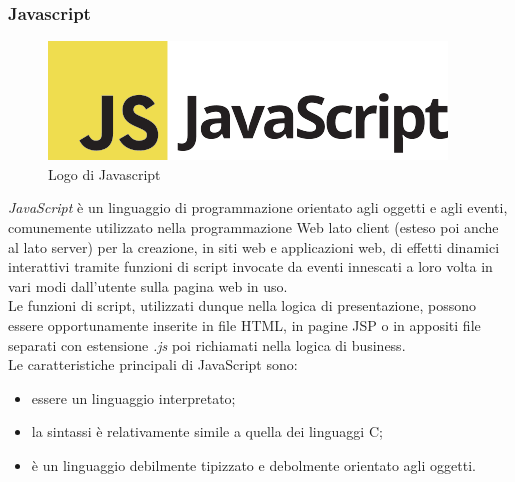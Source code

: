 \subsubsection*{Javascript}
\begin{figure}[!h] 
    \centering 
    \includegraphics[width=0.6\columnwidth]{immagini/cap4/Javascript_logo_2.png} 
    \caption{Logo di Javascript}
\end{figure}
\noindent \textit{JavaScript} è un linguaggio di programmazione orientato agli oggetti e agli eventi, comunemente utilizzato nella programmazione Web lato client (esteso poi anche al lato server) per la creazione, in siti web e applicazioni web, di effetti dinamici interattivi tramite funzioni di script invocate da eventi innescati a loro volta in vari modi dall'utente sulla pagina web in uso. \\
Le funzioni di script, utilizzati dunque nella logica di presentazione, possono essere opportunamente inserite in file HTML, in pagine JSP o in appositi file separati con estensione \textit{.js} poi richiamati nella logica di business. \\
Le caratteristiche principali di JavaScript sono:
\begin{itemize}
    \item essere un linguaggio interpretato;
    \item la sintassi è relativamente simile a quella dei linguaggi C;
    \item è un linguaggio debilmente tipizzato e debolmente orientato agli oggetti.
\end{itemize}

